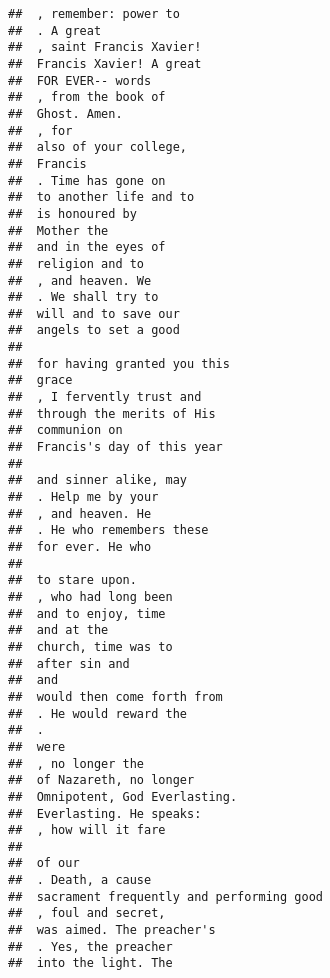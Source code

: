 \documentclass[]{article}
\begin{document}
\begin{verbatim}
##  , remember: power to                    
##  . A great                               
##  , saint Francis Xavier!                 
##  Francis Xavier! A great                 
##  FOR EVER-- words                        
##  , from the book of                      
##  Ghost. Amen.                            
##  , for                                   
##  also of your college,                   
##  Francis                                 
##  . Time has gone on                      
##  to another life and to                  
##  is honoured by                          
##  Mother the                              
##  and in the eyes of                      
##  religion and to                         
##  , and heaven. We                        
##  . We shall try to                       
##  will and to save our                    
##  angels to set a good                    
##                                          
##  for having granted you this             
##  grace                                   
##  , I fervently trust and                 
##  through the merits of His               
##  communion on                            
##  Francis's day of this year              
##                                          
##  and sinner alike, may                   
##  . Help me by your                       
##  , and heaven. He                        
##  . He who remembers these                
##  for ever. He who                        
##                                          
##  to stare upon.                          
##  , who had long been                     
##  and to enjoy, time                      
##  and at the                              
##  church, time was to                     
##  after sin and                           
##  and                                     
##  would then come forth from              
##  . He would reward the                   
##  .                                       
##  were                                    
##  , no longer the                         
##  of Nazareth, no longer                  
##  Omnipotent, God Everlasting.            
##  Everlasting. He speaks:                 
##  , how will it fare                      
##                                          
##  of our                                  
##  . Death, a cause                        
##  sacrament frequently and performing good
##  , foul and secret,                      
##  was aimed. The preacher's               
##  . Yes, the preacher                     
##  into the light. The                     

\end{verbatim}
\end{document}
